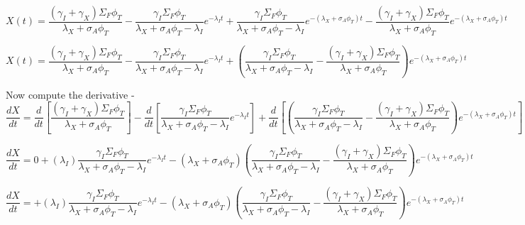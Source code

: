 \documentclass[11pt,a4paper]{article}
\begin{document}
\begin{equation} 
        X(t)=
        \frac{(\gamma_I+\gamma_X)\Sigma_F\phi_T}{\lambda_X+\sigma_A\phi_T}
        -\frac{\gamma_I\Sigma_F\phi_T}{\lambda_X+\sigma_A\phi_T-\lambda_I}e^{-\lambda_I t}
        +\frac{\gamma_I\Sigma_F\phi_T}{\lambda_X+\sigma_A\phi_T-\lambda_I}e^{-(\lambda_X+\sigma_A\phi_T)t}
        -\frac{(\gamma_I+\gamma_X)\Sigma_F\phi_T}{\lambda_X+\sigma_A\phi_T}e^{-(\lambda_X+\sigma_A\phi_T)t}
\end{equation}

\begin{equation} 
        X(t)=
        \frac{(\gamma_I+\gamma_X)\Sigma_F\phi_T}{\lambda_X+\sigma_A\phi_T}
        -\frac{\gamma_I\Sigma_F\phi_T}{\lambda_X+\sigma_A\phi_T-\lambda_I}e^{-\lambda_I t}
        +(\frac{\gamma_I\Sigma_F\phi_T}{\lambda_X+\sigma_A\phi_T-\lambda_I}
        -\frac{(\gamma_I+\gamma_X)\Sigma_F\phi_T}{\lambda_X+\sigma_A\phi_T})e^{-(\lambda_X+\sigma_A\phi_T)t}
\end{equation}

Now compute the derivative - 
\begin{equation} 
    \frac{dX}{dt}=
        \frac{d}{dt}[\frac{(\gamma_I+\gamma_X)\Sigma_F\phi_T}{\lambda_X+\sigma_A\phi_T}]
        -\frac{d}{dt}[\frac{\gamma_I\Sigma_F\phi_T}{\lambda_X+\sigma_A\phi_T-\lambda_I}e^{-\lambda_I t}]
        +\frac{d}{dt}[(\frac{\gamma_I\Sigma_F\phi_T}{\lambda_X+\sigma_A\phi_T-\lambda_I}
        -\frac{(\gamma_I+\gamma_X)\Sigma_F\phi_T}{\lambda_X+\sigma_A\phi_T})e^{-(\lambda_X+\sigma_A\phi_T)t}]
\end{equation}

\begin{equation} 
    \frac{dX}{dt}=
        0
        +(\lambda_I)\frac{\gamma_I\Sigma_F\phi_T}{\lambda_X+\sigma_A\phi_T-\lambda_I}e^{-\lambda_I t}
        -(\lambda_X+\sigma_A\phi_T)(\frac{\gamma_I\Sigma_F\phi_T}{\lambda_X+\sigma_A\phi_T-\lambda_I}
        -\frac{(\gamma_I+\gamma_X)\Sigma_F\phi_T}{\lambda_X+\sigma_A\phi_T})e^{-(\lambda_X+\sigma_A\phi_T)t}
\end{equation}

\begin{equation} 
    \frac{dX}{dt}=
        +(\lambda_I)\frac{\gamma_I\Sigma_F\phi_T}{\lambda_X+\sigma_A\phi_T-\lambda_I}e^{-\lambda_I t}
        -(\lambda_X+\sigma_A\phi_T)(\frac{\gamma_I\Sigma_F\phi_T}{\lambda_X+\sigma_A\phi_T-\lambda_I}
        -\frac{(\gamma_I+\gamma_X)\Sigma_F\phi_T}{\lambda_X+\sigma_A\phi_T})e^{-(\lambda_X+\sigma_A\phi_T)t}
\end{equation}
\end{document}
